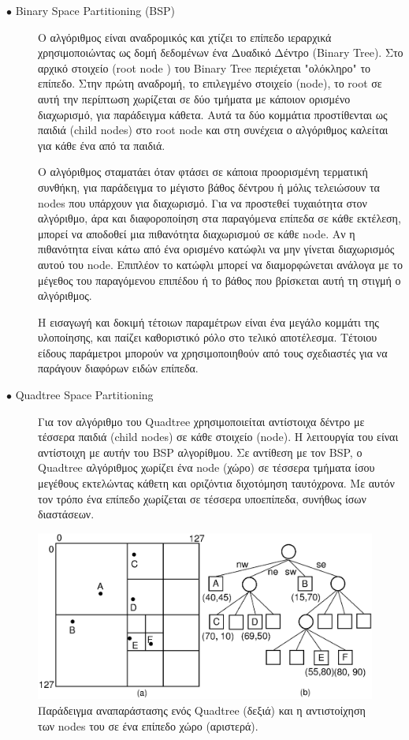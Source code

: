 \begin{description}
  \item[$\bullet$ Binary Space Partitioning (BSP)]
  Ο αλγόριθμος είναι αναδρομικός και χτίζει το επίπεδο ιεραρχικά χρησιμοποιώντας ως δομή δεδομένων ένα Δυαδικό Δέντρο (Binary Tree). Στο αρχικό στοιχείο (root node ) του Binary Tree περιέχεται "ολόκληρο" το επίπεδο. Στην πρώτη αναδρομή, το επιλεγμένο στοιχείο (node), το root σε αυτή την περίπτωση χωρίζεται σε δύο τμήματα με κάποιον ορισμένο διαχωρισμό, για παράδειγμα κάθετα. Αυτά τα δύο κομμάτια προστίθενται ως παιδιά (child nodes) στο root node και στη συνέχεια ο αλγόριθμος καλείται για κάθε ένα από τα παιδιά.
  \par
  Ο αλγόριθμος σταματάει όταν φτάσει σε κάποια προορισμένη τερματική συνθήκη, για παράδειγμα το μέγιστο βάθος δέντρου ή μόλις τελειώσουν τα nodes που υπάρχουν για διαχωρισμό. Για να προστεθεί τυχαιότητα στον αλγόριθμο, άρα και διαφοροποίηση στα παραγόμενα επίπεδα σε κάθε εκτέλεση, μπορεί να αποδοθεί μια πιθανότητα διαχωρισμού σε κάθε node. Αν η πιθανότητα είναι κάτω από ένα ορισμένο κατώφλι να μην γίνεται διαχωρισμός αυτού του node. Επιπλέον το κατώφλι μπορεί να διαμορφώνεται ανάλογα με το μέγεθος του παραγόμενου επιπέδου ή το βάθος που βρίσκεται αυτή τη στιγμή ο αλγόριθμος.
  \par 
  Η εισαγωγή και δοκιμή τέτοιων παραμέτρων είναι ένα μεγάλο κομμάτι της υλοποίησης, και παίζει καθοριστικό ρόλο στο τελικό αποτέλεσμα. Τέτοιου είδους παράμετροι μπορούν να χρησιμοποιηθούν από τους σχεδιαστές για να παράγουν διαφόρων ειδών επίπεδα.
\end{description}

\begin{description}
  \item[$\bullet$ Quadtree Space Partitioning]
  Για τον αλγόριθμο του Quadtree χρησιμοποιείται αντίστοιχα δέντρο με τέσσερα παιδιά (child nodes) σε κάθε στοιχείο (node). Η λειτουργία του είναι αντίστοιχη με αυτήν του BSP αλγορίθμου. Σε αντίθεση με τον BSP, ο Quadtree αλγόριθμος χωρίζει ένα node (χώρο) σε τέσσερα τμήματα ίσου μεγέθους εκτελώντας κάθετη και οριζόντια διχοτόμηση ταυτόχρονα. Με αυτόν τον τρόπο ένα επίπεδο χωρίζεται σε τέσσερα υποεπίπεδα, συνήθως ίσων διαστάσεων. 
\end{description}

\begin{figure}[H]
\centering
\includegraphics[width=.8\linewidth]{../images/other/quadtree.png}
\caption{Παράδειγμα αναπαράστασης ενός Quadtree (δεξιά) και η αντιστοίχηση των nodes του σε ένα επίπεδο χώρο (αριστερά). \cite{quad_tree_image} }
\label{fig:fig}
\end{figure}

